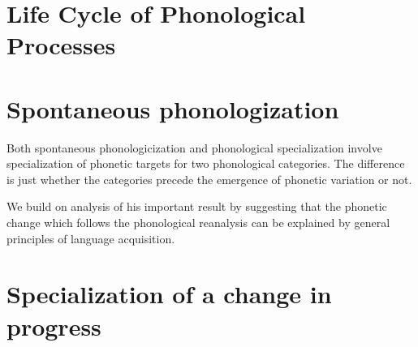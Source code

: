 


\section{Life Cycle of Phonological Processes}
\label{trad}



\section{Spontaneous phonologization}
\label{philly}

Both spontaneous phonologicization and phonological specialization involve specialization of phonetic targets for two phonological categories. The difference is just whether the categories precede the emergence of phonetic variation or not.

We build on \citet{fruehwald2013} analysis of his important result by suggesting that the phonetic change which follows the phonological reanalysis can be explained by general principles of language acquisition.

\section{Specialization of a change in progress}
\label{newzea}





